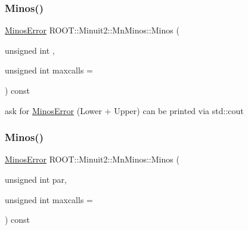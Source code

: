 \subsubsection{\texorpdfstring{Minos()}{Minos()}\hspace{0.1cm}{\footnotesize\ttfamily [1/2]}}
{\footnotesize\ttfamily \mbox{\hyperlink{classROOT_1_1Minuit2_1_1MinosError}{Minos\+Error}} R\+O\+O\+T\+::\+Minuit2\+::\+Mn\+Minos\+::\+Minos (\begin{DoxyParamCaption}\item[{unsigned int}]{,  }\item[{unsigned int}]{maxcalls = {} }\end{DoxyParamCaption}) const}

ask for \mbox{\hyperlink{classROOT_1_1Minuit2_1_1MinosError}{Minos\+Error}} (Lower + Upper) can be printed via std\+::cout \mbox{\label{classROOT_1_1Minuit2_1_1MnMinos_aeb1fe39f5851b5af050191d812d21723}} 
\subsubsection{\texorpdfstring{Minos()}{Minos()}\hspace{0.1cm}{\footnotesize\ttfamily [2/2]}}
{\footnotesize\ttfamily \mbox{\hyperlink{classROOT_1_1Minuit2_1_1MinosError}{Minos\+Error}} R\+O\+O\+T\+::\+Minuit2\+::\+Mn\+Minos\+::\+Minos (\begin{DoxyParamCaption}\item[{unsigned int}]{par,  }\item[{unsigned int}]{maxcalls = {} }\end{DoxyParamCaption}) const}

